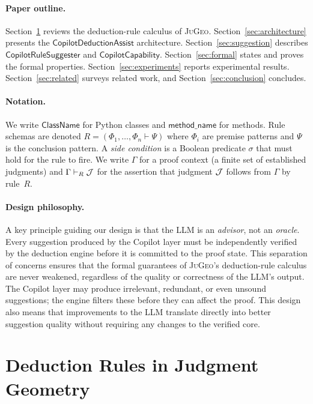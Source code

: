 \documentclass[11pt]{article}
\newcommand{\CDA}{\ensuremath{\mathsf{CopilotDeductionAssist}}}
\newcommand{\CRS}{\ensuremath{\mathsf{CopilotRuleSuggester}}}
\newcommand{\CC}{\ensuremath{\mathsf{CopilotCapability}}}
\newcommand{\JG}{\textsc{JuGeo}}
\newcommand{\LLM}{\textsc{LLM}}
\begin{document}
\paragraph{Paper outline.}
Section~\ref{sec:deduction} reviews the deduction-rule calculus of
\JG{}.  Section~\ref{sec:architecture} presents the $\CDA$
architecture.  Section~\ref{sec:suggestion} describes $\CRS$ and
$\CC$.  Section~\ref{sec:formal} states and proves the formal
properties.  Section~\ref{sec:experiments} reports experimental
results.  Section~\ref{sec:related} surveys related work, and
Section~\ref{sec:conclusion} concludes.

\paragraph{Notation.}
We write $\mathsf{ClassName}$ for Python classes and
$\mathsf{method\_name}$ for methods.  Rule schemas are denoted
$R = (\Phi_1, \ldots, \Phi_n \vdash \Psi)$ where $\Phi_i$ are
premise patterns and $\Psi$ is the conclusion pattern.  A
\emph{side condition} is a Boolean predicate $\sigma$ that must
hold for the rule to fire.  We write $\Gamma$ for a proof context
(a finite set of established judgments) and $\Gamma \vdash_R \mathcal{J}$
for the assertion that judgment $\mathcal{J}$ follows from $\Gamma$ by
rule~$R$.

\paragraph{Design philosophy.}
A key principle guiding our design is that the \LLM{} is an
\emph{advisor}, not an \emph{oracle}.  Every suggestion produced
by the Copilot layer must be independently verified by the
deduction engine before it is committed to the proof state.  This
separation of concerns ensures that the formal guarantees of
\JG{}'s deduction-rule calculus are never weakened, regardless of
the quality or correctness of the \LLM{}'s output.  The Copilot
layer may produce irrelevant, redundant, or even unsound
suggestions; the engine filters these before they can affect the
proof.  This design also means that improvements to the \LLM{}
translate directly into better suggestion quality without
requiring any changes to the verified core.


\section{Deduction Rules in Judgment Geometry}\label{sec:deduction}
\end{document}
